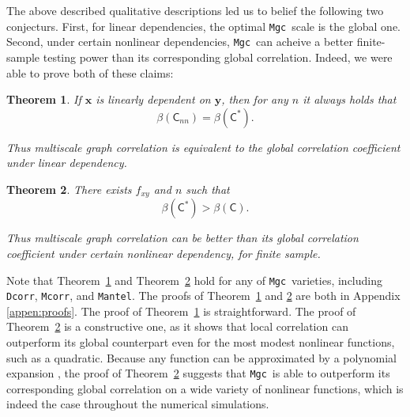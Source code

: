 \documentclass[11pt]{article}
\providecommand{\sct}[1]{{\sc \texttt{#1}}}
\providecommand{\mb}[1]{\boldsymbol{#1}}
\newcommand{\G}{\mathsf{C}}
\newcommand{\Mgc}{\sct{Mgc}}
\newcommand{\Dcorr}{\sct{Dcorr}}
\newcommand{\Mcorr}{\sct{Mcorr}}
\newcommand{\Mantel}{\sct{Mantel}}
\newtheorem{thm}{Theorem}
\begin{document}
The above described qualitative descriptions led us to belief the following two conjecturs.  First, for linear dependencies,  the optimal \Mgc~scale is the global one. Second, under certain nonlinear dependencies, \Mgc~can acheive a better finite-sample testing power than its corresponding global correlation. Indeed, we were able to prove both of these claims:

\begin{thm}
\label{thm2}
If $\mb{x}$ is linearly dependent on $\mb{y}$, then for any $n$ it always holds that
\begin{equation}
\beta(\G_{nn}) = \beta(\G^{*}).
\end{equation}

Thus multiscale graph correlation is equivalent to the global correlation coefficient under linear dependency.
\end{thm}

\begin{thm}
\label{thm3}
There exists $f_{xy}$ and $n$ such that 
\begin{equation}
\beta(\G^{*}) > \beta(\G).
\end{equation}

Thus multiscale graph correlation can be better than its global correlation coefficient under certain nonlinear dependency, for finite sample.
\end{thm}
Note that Theorem~\ref{thm2} and Theorem~\ref{thm3} hold for any of \Mgc~varieties, including  \Dcorr, \Mcorr, and \Mantel.
% 
The proofs of Theorem~\ref{thm2} and \ref{thm3} are both in Appendix \ref{appen:proofs}.  The proof of Theorem~\ref{thm2} is straightforward.  The proof of Theorem~\ref{thm3} is a constructive one, as it shows that local correlation can outperform its global counterpart even for the most modest nonlinear functions, such as a quadratic.  Because any function can be approximated by a polynomial expansion \cite{RudinBook}, the proof of Theorem~\ref{thm3} suggests that \Mgc~is able to outperform its corresponding global correlation on a wide variety of nonlinear functions, which is indeed the case throughout the numerical simulations.
\end{document}
